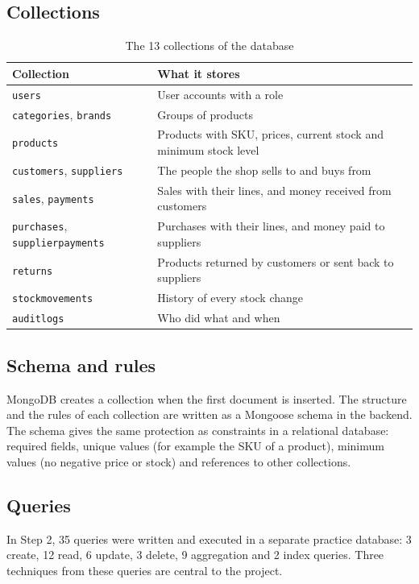 \documentclass[11pt,a4paper]{article}
\newcommand{\code}[1]{\texttt{#1}}
\begin{document}
\subsection{Collections}
\begin{table}[H]
\centering
\begin{tabularx}{\textwidth}{@{}P{5.4cm}Y@{}}
\toprule
\textbf{Collection} & \textbf{What it stores} \\
\midrule
\code{users} & User accounts with a role \\
\code{categories}, \code{brands} & Groups of products \\
\code{products} & Products with SKU, prices, current stock and minimum stock level \\
\code{customers}, \code{suppliers} & The people the shop sells to and buys from \\
\code{sales}, \code{payments} & Sales with their lines, and money received from customers \\
\code{purchases}, \code{supplierpayments} & Purchases with their lines, and money paid to suppliers \\
\code{returns} & Products returned by customers or sent back to suppliers \\
\code{stockmovements} & History of every stock change \\
\code{auditlogs} & Who did what and when \\
\bottomrule
\end{tabularx}
\caption{The 13 collections of the database}
\end{table}

\subsection{Schema and rules}
MongoDB creates a collection when the first document is inserted. The structure and the rules of each collection are written as a Mongoose schema in the backend. The schema gives the same protection as constraints in a relational database: required fields, unique values (for example the SKU of a product), minimum values (no negative price or stock) and references to other collections.

\subsection{Queries}
In Step 2, 35 queries were written and executed in a separate practice database: 3 create, 12 read, 6 update, 3 delete, 9 aggregation and 2 index queries. Three techniques from these queries are central to the project.
\end{document}
